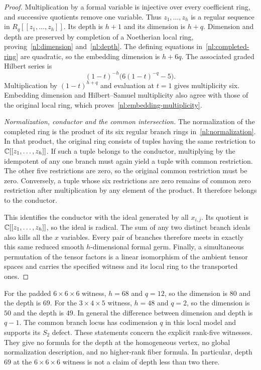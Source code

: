 \begin{proof}
Multiplication by a formal variable is injective over every
coefficient ring, and successive quotients remove one variable.
Thus $z_1,\ldots,z_h$ is a regular sequence in
$R_q[[z_1,\ldots,z_h]]$. Its depth is $h+1$ and its dimension is
$h+q$. Dimension and depth are preserved by completion of a
Noetherian local ring, proving~\eqref{nl:dimension}
and~\eqref{nl:depth}.
The defining equations in~\eqref{nl:completed-ring} are quadratic,
so the embedding dimension is $h+6q$.
The associated graded Hilbert series is
\begin{equation}\label{nl:hilbert-series}
 (1-t)^{-h}\bigl(6(1-t)^{-q}-5\bigr).
\end{equation}
Multiplication by $(1-t)^{h+q}$ and evaluation at $t=1$ gives
multiplicity six. Embedding dimension and Hilbert--Samuel
multiplicity also agree with those of the original local ring,
which proves~\eqref{nl:embedding-multiplicity}.

\medskip
\emph{Normalization, conductor and the common intersection.}
The normalization of the completed ring is the product of its
six regular branch rings in~\eqref{nl:normalization}.
In that product, the original ring consists of tuples having the
same restriction to $\mathbb C[[z_1,\ldots,z_h]]$.
If such a tuple belongs to the conductor, multiplying by the
idempotent of any one branch must again yield a tuple with common
restriction. The other five restrictions are zero, so the original
common restriction must be zero. Conversely, a tuple whose six
restrictions are zero remains of common zero restriction after
multiplication by any element of the product. It therefore belongs
to the conductor.

This identifies the conductor with the ideal generated by all
$x_{i,j}$. Its quotient is $\mathbb C[[z_1,\ldots,z_h]]$, so the ideal is
radical. The sum of any two distinct branch ideals also kills all
the $x$ variables. Every pair of branches therefore meets in
exactly this same reduced smooth $h$-dimensional formal germ.
Finally, a simultaneous permutation of the tensor factors is a
linear isomorphism of the ambient tensor spaces and carries the
specified witness and its local ring to the transported ones.
\end{proof}

\begin{remark}\label{nl:scope}
For the padded $6\times6\times6$ witness, $h=68$ and $q=12$,
so the dimension is $80$ and the depth is $69$.
For the $3\times4\times5$ witness, $h=48$ and $q=2$,
so the dimension is $50$ and the depth is $49$.
In general the difference between dimension and depth is $q-1$.
The common branch locus has codimension $q$ in this local model
and supports its $S_2$ defect. These statements concern the explicit
rank-five witnesses. They give no formula for the depth at the
homogeneous vertex, no global normalization description, and no
higher-rank fiber formula. In particular, depth $69$ at the
$6\times6\times6$ witness is not a claim of depth less than two there.
\end{remark}
